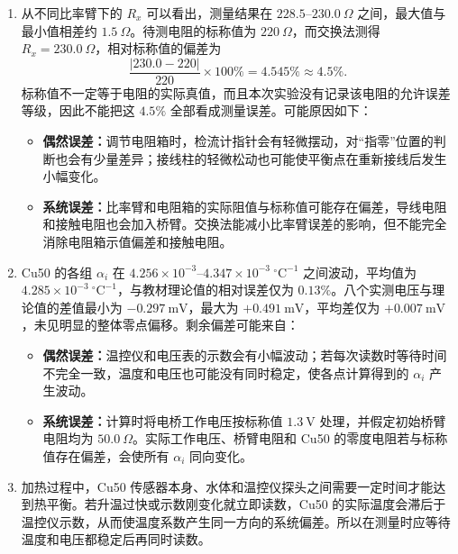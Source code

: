 \begin{enumerate}
  \item 从不同比率臂下的 $R_x$ 可以看出，测量结果在 $228.5\text{--}230.0\ \Omega$ 之间，最大值与最小值相差约 $1.5\ \Omega$。待测电阻的标称值为 $220\ \Omega$，而交换法测得 $R_x=230.0\ \Omega$，相对标称值的偏差为
  \begin{equation}
    \frac{|230.0-220|}{220}\times100\%=4.545\%\approx4.5\%.
  \end{equation}
  标称值不一定等于电阻的实际真值，而且本次实验没有记录该电阻的允许误差等级，因此不能把这 $4.5\%$ 全部看成测量误差。可能原因如下：
  \begin{itemize}
    \item \textbf{偶然误差：}调节电阻箱时，检流计指针会有轻微摆动，对“指零”位置的判断也会有少量差异；接线柱的轻微松动也可能使平衡点在重新接线后发生小幅变化。
    \item \textbf{系统误差：}比率臂和电阻箱的实际阻值与标称值可能存在偏差，导线电阻和接触电阻也会加入桥臂。交换法能减小比率臂误差的影响，但不能完全消除电阻箱示值偏差和接触电阻。
  \end{itemize}

  \item Cu50 的各组 $\alpha_i$ 在 $4.256\times10^{-3}\text{--}4.347\times10^{-3}\ {}^\circ\mathrm C^{-1}$ 之间波动，平均值为 $4.285\times10^{-3}\ {}^\circ\mathrm C^{-1}$，与教材理论值的相对误差仅为 $0.13\%$。八个实测电压与理论值的差值最小为 $-0.297\ \mathrm{mV}$，最大为 $+0.491\ \mathrm{mV}$，平均差仅为 $+0.007\ \mathrm{mV}$，未见明显的整体零点偏移。剩余偏差可能来自：
  \begin{itemize}
    \item \textbf{偶然误差：}温控仪和电压表的示数会有小幅波动；若每次读数时等待时间不完全一致，温度和电压也可能没有同时稳定，使各点计算得到的 $\alpha_i$ 产生波动。
    \item \textbf{系统误差：}计算时将电桥工作电压按标称值 $1.3\ \mathrm V$ 处理，并假定初始桥臂电阻均为 $50.0\ \Omega$。实际工作电压、桥臂电阻和 Cu50 的零度电阻若与标称值存在偏差，会使所有 $\alpha_i$ 同向变化。
  \end{itemize}

  \item 加热过程中，Cu50 传感器本身、水体和温控仪探头之间需要一定时间才能达到热平衡。若升温过快或示数刚变化就立即读数，Cu50 的实际温度会滞后于温控仪示数，从而使温度系数产生同一方向的系统偏差。所以在测量时应等待温度和电压都稳定后再同时读数。
\end{enumerate}
